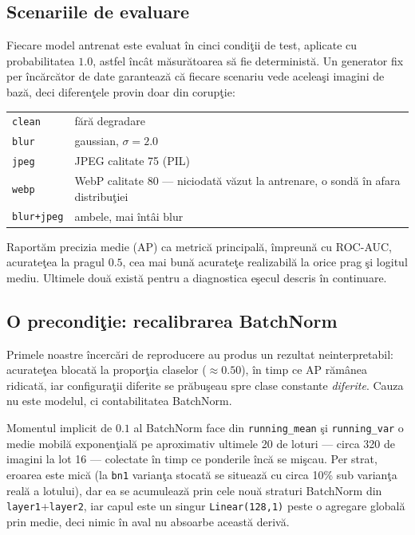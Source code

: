 \subsection{Scenariile de evaluare}

Fiecare model antrenat este evaluat în cinci condiţii de test, aplicate cu
probabilitatea $1.0$, astfel încât măsurătoarea să fie deterministă. Un generator
fix per încărcător de date garantează că fiecare scenariu vede aceleaşi imagini
de bază, deci diferenţele provin doar din corupţie:

\begin{center}
\begin{tabular}{ll}
  \toprule
  \texttt{clean}     & fără degradare \\
  \texttt{blur}      & gaussian, $\sigma = 2.0$ \\
  \texttt{jpeg}      & JPEG calitate 75 (PIL) \\
  \texttt{webp}      & WebP calitate 80 --- niciodată văzut la antrenare, o sondă în afara distribuţiei \\
  \texttt{blur+jpeg} & ambele, mai întâi blur \\
  \bottomrule
\end{tabular}
\end{center}

Raportăm precizia medie (AP) ca metrică principală, împreună cu ROC-AUC,
acurateţea la pragul $0.5$, cea mai bună acurateţe realizabilă la orice prag şi
logitul mediu. Ultimele două există pentru a diagnostica eşecul descris în
continuare.

\subsection{O precondiţie: recalibrarea BatchNorm}
\label{sec:setup-bn}

Primele noastre încercări de reproducere au produs un rezultat neinterpretabil:
acurateţea blocată la proporţia claselor ($\approx0.50$), în timp ce AP rămânea
ridicată, iar configuraţii diferite se prăbuşeau spre clase constante
\emph{diferite}. Cauza nu este modelul, ci contabilitatea BatchNorm.

Momentul implicit de $0.1$ al BatchNorm face din \texttt{running\_mean} şi
\texttt{running\_var} o medie mobilă exponenţială pe aproximativ ultimele 20 de
loturi --- circa 320 de imagini la lot 16 --- colectate în timp ce ponderile
încă se mişcau. Per strat, eroarea este mică (la \texttt{bn1} varianţa stocată
se situează cu circa 10\% sub varianţa reală a lotului), dar ea se acumulează
prin cele nouă straturi BatchNorm din \texttt{layer1}+\texttt{layer2}, iar capul
este un singur \texttt{Linear(128,1)} peste o agregare globală prin medie, deci
nimic în aval nu absoarbe această derivă.

